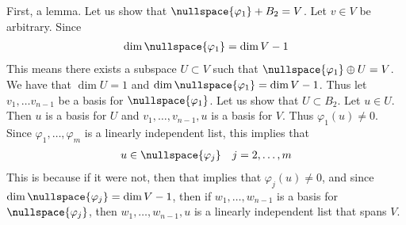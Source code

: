 \documentclass{book}
\begin{document}
\begin{enumerate}[label=\arabic*)]
      First, a lemma. Let us show that $\nullspace{\varphi_1} + B_2 = V$. Let $v \in V$ be arbitrary. Since 
      \begin{align*}
        \dim{\nullspace{\varphi_1}} = \dim{V} - 1
      \end{align*}
      This means there exists a subspace $U \subset V$ such that $\nullspace{\varphi_1} \oplus U = V$. We have that $\dim{U} = 1$ and $\dim{\nullspace{\varphi_1}} = \dim{V - 1}$. Thus let
      $v_1, \dots v_{n - 1}$ be a basis for $\nullspace{\varphi_1}$. Let us show that $U \subset B_2$. Let $u \in U$. Then $u$ is a basis for $U$ and $v_1, \dots, v_{n - 1}, u$ is a basis
      for $V$. Thus $\varphi_1(u) \neq 0$. Since $\varphi_1, \dots, \varphi_m$ is a linearly independent list, this implies that 
      \begin{align*}
        u \in \nullspace{\varphi_j} \quad j = 2, \dots, m
      \end{align*}
      This is because if it were not, then that implies that $\varphi_j(u) \neq 0$, and since $\dim{\nullspace{\varphi_j}} = \dim{V} - 1$, then if $w_1, \dots, w_{n - 1}$ is a basis for
      $\nullspace{\varphi_j}$, then $w_1, \dots, w_{n - 1}, u$ is a linearly independent list that spans $V$. 


\end{enumerate}
\end{document}
